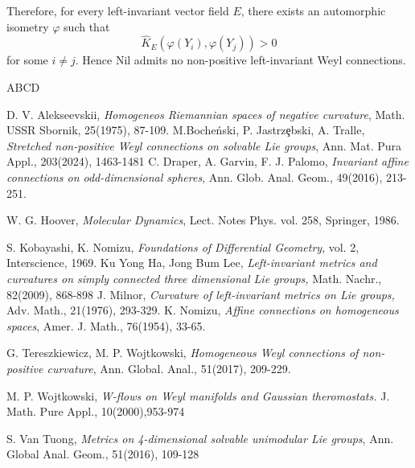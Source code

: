 \documentclass[12pt]{article}
\begin{document}
Therefore, for every left-invariant vector field \(E\), there exists an
automorphic isometry \(\varphi\) such that
\[
\widehat K_E(\varphi(Y_i),\varphi(Y_j))>0
\]
for some \(i\neq j\). Hence Nil admits no non-positive left-invariant Weyl
connections.
\begin{thebibliography}{ABCD}

 D. V. Alekseevskii, {\it Homogeneos Riemannian spaces of negative curvature}, Math. USSR Sbornik, 25(1975), 87-109.
 M.Boche\'nski, P. Jastrz\c ebski, A. Tralle,  {\it Stretched non-positive Weyl connections on solvable Lie groups}, Ann.  Mat. Pura  Appl., 203(2024), 1463-1481
 C. Draper, A. Garvin, F. J. Palomo, {\it Invariant affine connections on odd-dimensional spheres}, Ann. Glob. Anal. Geom., 49(2016), 213-251.

 W. G. Hoover, {\it Molecular Dynamics}, Lect. Notes Phys. vol. 258, Springer, 1986. 

 S. Kobayashi, K. Nomizu, {\it Foundations of Differential Geometry}, vol. 2, Interscience, 1969.
 Ku Yong Ha, Jong Bum Lee, {\it Left-invariant metrics and curvatures on simply connected three dimensional Lie groups,} Math. Nachr., 82(2009), 868-898
 J. Milnor, {\it Curvature of left-invariant metrics on Lie groups,} Adv. Math., 21(1976), 293-329.
 K. Nomizu, {\it Affine connections on homogeneous spaces}, Amer. J. Math., 76(1954), 33-65.

 G. Tereszkiewicz, M. P. Wojtkowski, {\it Homogeneous Weyl connections of non-positive curvature}, Ann. Global. Anal., 51(2017), 209-229.

 M. P. Wojtkowski, {\it W-flows on Weyl manifolds and Gaussian theromostats.} J.  Math. Pure Appl., 10(2000),953-974

 S. Van Tuong, {\it Metrics on 4-dimensional solvable unimodular Lie groups}, Ann. Global Anal. Geom., 51(2016), 109-128 
\end{thebibliography}
\end{document}
